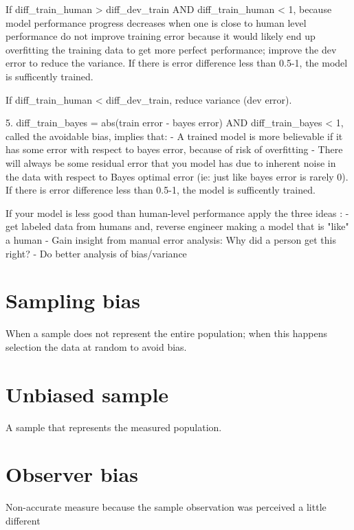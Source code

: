 \documentclass[11pt, onecolumn]{article}
\begin{document}
If diff_train_human > diff_dev_train AND diff_train_human < 1, because model performance progress decreases when one is close to human level performance do not improve training error because it would likely end up overfitting the training data to get more perfect performance; improve the dev error to reduce the variance. If there is error difference less than 0.5-1, the model is sufficently trained.

If diff_train_human < diff_dev_train, reduce variance (dev error). 

5. diff_train_bayes = abs(train error - bayes error) AND diff_train_bayes < 1, called the avoidable bias, implies that:
	- A trained model is more believable if it has some error with respect to bayes error, because of risk of overfitting
	- There will always be some residual error that you model has due to inherent noise in the data with respect to Bayes optimal error (ie: just like bayes error is rarely 0).
If there is error difference less than 0.5-1, the model is sufficently trained.


If your model is less good than human-level performance apply the three ideas :
	- get labeled data from humans and, reverse engineer making a model that is "like" a human
	- Gain insight from manual error analysis: Why did a person get this right?
	- Do better analysis of bias/variance










    
    
\section{Sampling bias}
When a sample does not represent the entire population; when this happens selection the data at random to avoid bias.

\section{Unbiased sample}
A sample that represents the measured population.

\section{Observer bias}
Non-accurate measure because the sample observation was perceived a little different
\end{document}
